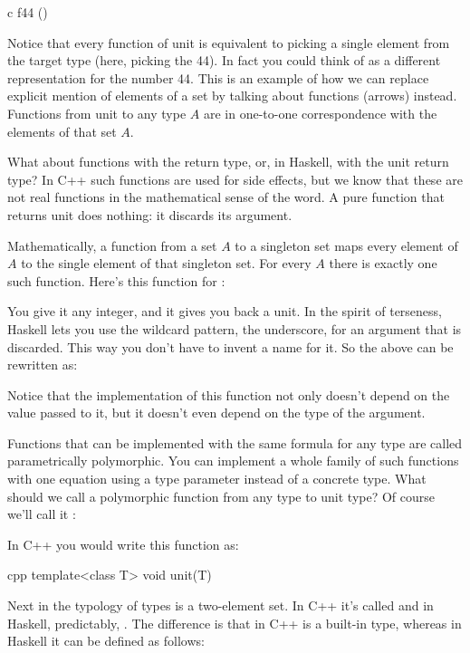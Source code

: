 \begin{snip}{c}
f44 ()
\end{snip}
Notice that every function of unit is equivalent to picking a single
element from the target type (here, picking the  44). In
fact you could think of  as a different representation for
the number 44. This is an example of how we can replace explicit mention
of elements of a set by talking about functions (arrows) instead.
Functions from unit to any type $A$ are in one-to-one correspondence with
the elements of that set $A$.

What about functions with the  return type, or, in Haskell,
with the unit return type? In C++ such functions are used for side
effects, but we know that these are not real functions in the
mathematical sense of the word. A pure function that returns unit does
nothing: it discards its argument.

Mathematically, a function from a set $A$ to a singleton set maps every
element of $A$ to the single element of that singleton set. For every $A$
there is exactly one such function. Here's this function for
:

You give it any integer, and it gives you back a unit. In the spirit of
terseness, Haskell lets you use the wildcard pattern, the underscore,
for an argument that is discarded. This way you don't have to invent a
name for it. So the above can be rewritten as:

Notice that the implementation of this function not only doesn't depend
on the value passed to it, but it doesn't even depend on the type of the
argument.

Functions that can be implemented with the same formula for any type are
called parametrically polymorphic. You can implement a whole family of
such functions with one equation using a type parameter instead of a
concrete type. What should we call a polymorphic function from any type
to unit type? Of course we'll call it :

In C++ you would write this function as:

\begin{snip}{cpp}
template<class T>
void unit(T) {}
\end{snip}
Next in the typology of types is a two-element set. In C++ it's called
 and in Haskell, predictably, . The difference
is that in C++  is a built-in type, whereas in Haskell it
can be defined as follows:

